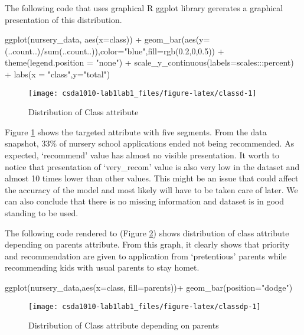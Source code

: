 The following code that uses graphical R ggplot library
\citep{R-ggplot2} gererates a graphical presentation of this
distribution.

\begin{Schunk}
\begin{Sinput}
ggplot(nursery_data, aes(x=class)) + 
  geom_bar(aes(y= (..count..)/sum(..count..)),color="blue",fill=rgb(0.2,0,0.5)) +
  theme(legend.position = "none") +
  scale_y_continuous(labels=scales:::percent) +
  labs(x = "class",y="total")
\end{Sinput}
\begin{figure}[h]

{\centering \texttt{[image: csda1010-lab1lab1\_files/figure-latex/classd-1]} 

}

\caption[Distribution of Class attribute]{Distribution of Class attribute}\label{fig:classd}
\end{figure}
\end{Schunk}

Figure \ref{fig:classd} shows the targeted attribute with five segments.
From the data snapshot, 33\% of nursery school applications ended not
being recommended. As expected, `recommend' value has almost no visible
presentation. It worth to notice that presentation of `very\_recom'
value is also very low in the dataset and almost 10 times lower than
other values. This might be an issue that could affect the accuracy of
the model and most likely will have to be taken care of later. We can
also conclude that there is no missing information and dataset is in
good standing to be used.

The following code rendered to (Figure \ref{fig:classdp}) shows
distribution of class attribute depending on parents attribute. From
this graph, it clearly shows that priority and recommendation are given
to application from `pretentious' parents while recommending kids with
usual parents to stay homet.

\begin{Schunk}
\begin{Sinput}
ggplot(nursery_data,aes(x=class, fill=parents))+
  geom_bar(position="dodge")
\end{Sinput}
\begin{figure}[h]

{\centering \texttt{[image: csda1010-lab1lab1\_files/figure-latex/classdp-1]} 

}

\caption[Distribution of Class attribute depending on parents]{Distribution of Class attribute depending on parents}\label{fig:classdp}
\end{figure}
\end{Schunk}

